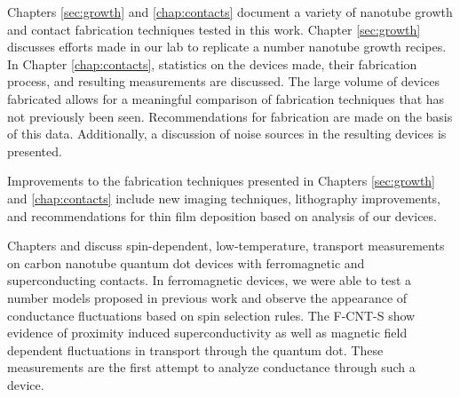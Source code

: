 Chapters \ref{sec:growth} and \ref{chap:contacts} document a variety of nanotube growth and contact fabrication techniques tested in this work. Chapter \ref{sec:growth} discusses  efforts made in our lab to replicate a number nanotube growth recipes. In Chapter \ref{chap:contacts}, statistics on the devices made, their fabrication process, and resulting measurements are discussed. The large volume of devices fabricated allows for a meaningful comparison of fabrication techniques that has not previously been seen. Recommendations for fabrication are made on the basis of this data. Additionally, a discussion of noise sources in the resulting devices is presented.

Improvements to the fabrication techniques presented in Chapters \ref{sec:growth} and \ref{chap:contacts} include new imaging techniques, lithography improvements, and recommendations for thin film deposition based on analysis of our devices.

Chapters \label{sec:FMCNTQD} and \label{sec:SCFM} discuss spin-dependent, low-temperature, transport measurements on carbon nanotube quantum dot devices with ferromagnetic and superconducting contacts. In ferromagnetic devices, we were able to test a number models proposed in previous work and observe the appearance of conductance fluctuations based on spin selection rules. The F-CNT-S show evidence of proximity induced superconductivity as well as magnetic field dependent fluctuations in transport through the quantum dot. These measurements are the first attempt to analyze conductance through such a device.

